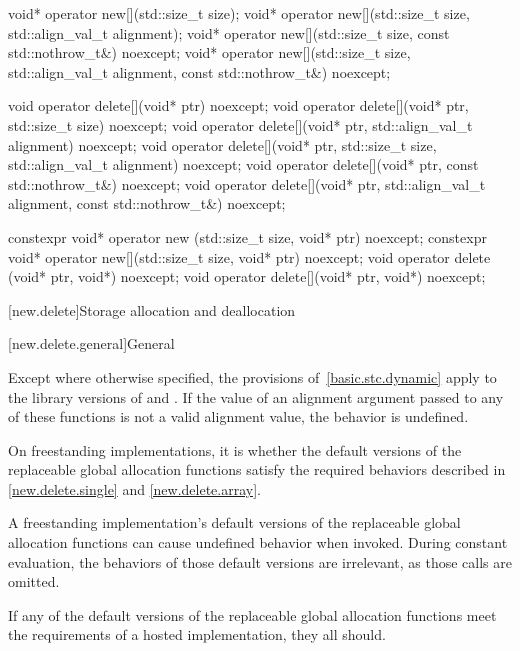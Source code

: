 \begin{codeblock}
void* operator new[](std::size_t size);
void* operator new[](std::size_t size, std::align_val_t alignment);
void* operator new[](std::size_t size, const std::nothrow_t&) noexcept;
void* operator new[](std::size_t size, std::align_val_t alignment,
                     const std::nothrow_t&) noexcept;

void operator delete[](void* ptr) noexcept;
void operator delete[](void* ptr, std::size_t size) noexcept;
void operator delete[](void* ptr, std::align_val_t alignment) noexcept;
void operator delete[](void* ptr, std::size_t size, std::align_val_t alignment) noexcept;
void operator delete[](void* ptr, const std::nothrow_t&) noexcept;
void operator delete[](void* ptr, std::align_val_t alignment, const std::nothrow_t&) noexcept;

constexpr void* operator new  (std::size_t size, void* ptr) noexcept;
constexpr void* operator new[](std::size_t size, void* ptr) noexcept;
void operator delete  (void* ptr, void*) noexcept;
void operator delete[](void* ptr, void*) noexcept;
\end{codeblock}

[new.delete]{Storage allocation and deallocation}

[new.delete.general]{General}

\pnum
Except where otherwise specified, the provisions of~\ref{basic.stc.dynamic}
apply to the library versions of  and .
If the value of an alignment argument
passed to any of these functions
is not a valid alignment value,
the behavior is undefined.

\pnum
On freestanding implementations,
it is 
whether the default versions of the replaceable global allocation functions
satisfy the required behaviors
described in \ref{new.delete.single} and \ref{new.delete.array}.
\begin{note}
A freestanding implementation's default versions of
the replaceable global allocation functions
can cause undefined behavior when invoked.
During constant evaluation,
the behaviors of those default versions are irrelevant,
as those calls are omitted.
\end{note}

\recommended
If any of the default versions of the replaceable global allocation functions
meet the requirements of a hosted implementation, they all should.

\newcommand{\replaceabledesc}[1]{%
A \Cpp{} program may define functions with #1 of these function signatures,
and thereby displace the default versions defined by the
\Cpp{} standard library.%
}

